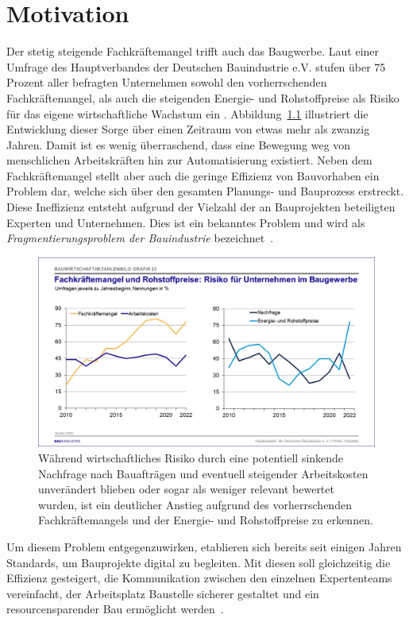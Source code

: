 \chapter{Motivation}\label{motivation}
Der stetig steigende Fachkräftemangel trifft auch das Baugwerbe. 
Laut einer Umfrage des Hauptverbandes der Deutschen Bauindustrie e.V. stufen über 75 Prozent aller befragten Unternehmen sowohl den vorherrschenden Fachkräftemangel, als auch die steigenden Energie- und Rohstoffpreise als Risiko für das eigene wirtschaftliche Wachstum ein \cite{Bauindustrie:online}.
Abbildung~\ref{fig:Fachkräftemangel} illustriert die Entwicklung dieser Sorge über einen Zeitraum von etwas mehr als zwanzig Jahren.
Damit ist es wenig überraschend, dass eine Bewegung weg von menschlichen Arbeitskräften hin zur Automatisierung existiert.
Neben dem Fachkräftemangel stellt aber auch die geringe Effizienz von Bauvorhaben ein Problem dar, welche sich über den gesamten Planungs- und Bauprozess erstreckt. 
Diese Ineffizienz entsteht aufgrund der Vielzahl der an Bauprojekten beteiligten Experten und Unternehmen.
Dies ist ein bekanntes Problem und wird als \textit{Fragmentierungsproblem der Bauindustrie} bezeichnet~\cite{ConstructionFragmentation}.
\begin{figure}[h]
    \centering
    \includegraphics[width=0.7\columnwidth]{fig/Grafik_23.jpg}
    \caption{Während wirtschaftliches Risiko durch eine potentiell sinkende Nachfrage nach Bauafträgen und eventuell steigender Arbeitskosten unverändert blieben oder sogar als weniger relevant bewertet wurden, ist ein deutlicher Anstieg aufgrund des vorherrschenden Fachkräftemangels und der Energie- und Rohstoffpreise zu erkennen.}
    \label{fig:Fachkräftemangel}
\end{figure}
Um diesem Problem entgegenzuwirken, etablieren sich bereits seit einigen Jahren Standards, um Bauprojekte digital zu begleiten.
Mit diesen soll gleichzeitig die Effizienz gesteigert, die Kommunikation zwischen den einzelnen Expertenteams vereinfacht, der Arbeitsplatz \glqq{}Baustelle\grqq{} sicherer gestaltet und ein resourcensparender Bau ermöglicht werden~\cite{BIMforHe12:online}\cite{Top10Ben31:online}.
